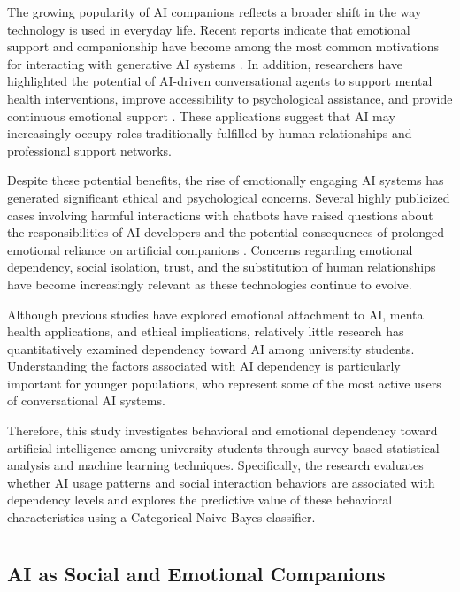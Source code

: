 \documentclass[10pt,a4paper]{article}
\begin{document}
The growing popularity of AI companions reflects a broader shift in the way technology is used in everyday life. Recent reports indicate that emotional support and companionship have become among the most common motivations for interacting with generative AI systems \cite{ref4}. In addition, researchers have highlighted the potential of AI-driven conversational agents to support mental health interventions, improve accessibility to psychological assistance, and provide continuous emotional support \cite{ref5}. These applications suggest that AI may increasingly occupy roles traditionally fulfilled by human relationships and professional support networks.

Despite these potential benefits, the rise of emotionally engaging AI systems has generated significant ethical and psychological concerns. Several highly publicized cases involving harmful interactions with chatbots have raised questions about the responsibilities of AI developers and the potential consequences of prolonged emotional reliance on artificial companions \cite{ref2,ref3}. Concerns regarding emotional dependency, social isolation, trust, and the substitution of human relationships have become increasingly relevant as these technologies continue to evolve.

Although previous studies have explored emotional attachment to AI, mental health applications, and ethical implications, relatively little research has quantitatively examined dependency toward AI among university students. Understanding the factors associated with AI dependency is particularly important for younger populations, who represent some of the most active users of conversational AI systems.

Therefore, this study investigates behavioral and emotional dependency toward artificial intelligence among university students through survey-based statistical analysis and machine learning techniques. Specifically, the research evaluates whether AI usage patterns and social interaction behaviors are associated with dependency levels and explores the predictive value of these behavioral characteristics using a Categorical Naive Bayes classifier.
\pagebreak
\section{{\color{colorIPN}{Literature Review}}}

\subsection{AI as Social and Emotional Companions}
\end{document}
